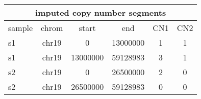 \documentclass{standalone}
\begin{document}
\begin{tabular}{|l|c|c|c|c|c|}
\hline
\multicolumn{6}{|c|}{\textbf{imputed copy number segments}}\\
\hline 

sample & chrom & start & end & CN1 & CN2 \\
\hline
s1 & chr19 & 0 & 13000000 & 1 & 1 \\
s1 & chr19 & 13000000 & 59128983 & 3 & 1 \\
s2 & chr19 & 0 & 26500000 & 2 & 0 \\
s2 & chr19 & 26500000 & 59128983 & 0 & 0 \\
\hline
\end{tabular}
\end{document}
